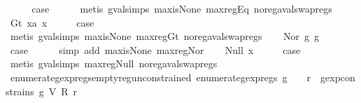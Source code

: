 \begin{isabellebody}
\ \ \isamarkupfalse%
\ \isamarkupfalse%
\ {\isacharquery}case\isanewline
\ \ \ \ \isamarkupfalse%
\ {\isacharparenleft}metis\ gval{\isachardot}simps{\isacharparenleft}{}{\isacharparenright}\ max{\isacharunderscore}is{\isacharunderscore}None\ max{\isacharunderscore}reg{\isacharunderscore}Eq\ no{\isacharunderscore}reg{\isacharunderscore}aval{\isacharunderscore}swap{\isacharunderscore}regs{\isacharparenright}\isanewline
{}\isamarkupfalse%
\isanewline
\ \ \isamarkupfalse%
\ {\isacharparenleft}Gt\ x{}a\ x{}{\isacharparenright}\isanewline
\ \ \isamarkupfalse%
\ \isamarkupfalse%
\ {\isacharquery}case\isanewline
\ \ \ \ \isamarkupfalse%
\ {\isacharparenleft}metis\ gval{\isachardot}simps{\isacharparenleft}{}{\isacharparenright}\ max{\isacharunderscore}is{\isacharunderscore}None\ max{\isacharunderscore}reg{\isacharunderscore}Gt\ no{\isacharunderscore}reg{\isacharunderscore}aval{\isacharunderscore}swap{\isacharunderscore}regs{\isacharparenright}\isanewline
{}\isamarkupfalse%
\isanewline
\ \ \isamarkupfalse%
\ {\isacharparenleft}Nor\ g{}\ g{}{\isacharparenright}\isanewline
\ \ \isamarkupfalse%
\ \isamarkupfalse%
\ {\isacharquery}case\isanewline
\ \ \ \ \isamarkupfalse%
\ {\isacharparenleft}simp\ add{\isacharcolon}\ max{\isacharunderscore}is{\isacharunderscore}None\ max{\isacharunderscore}reg{\isacharunderscore}Nor{\isacharparenright}\isanewline
{}\isamarkupfalse%
\isanewline
\ \ \isamarkupfalse%
\ {\isacharparenleft}Null\ x{\isacharparenright}\isanewline
\ \ \isamarkupfalse%
\ \isamarkupfalse%
\ {\isacharquery}case\isanewline
\ \ \ \ \isamarkupfalse%
\ {\isacharparenleft}metis\ gval{\isachardot}simps{\isacharparenleft}{}{\isacharparenright}\ max{\isacharunderscore}reg{\isacharunderscore}Null\ no{\isacharunderscore}reg{\isacharunderscore}aval{\isacharunderscore}swap{\isacharunderscore}regs{\isacharparenright}\isanewline
{}\isamarkupfalse%
%
\endisatagproof
{\isafoldproof}%
%
\isadelimproof
\isanewline
%
\endisadelimproof
\isanewline
{}\isamarkupfalse%
\ enumerate{\isacharunderscore}gexp{\isacharunderscore}regs{\isacharunderscore}empty{\isacharunderscore}reg{\isacharunderscore}unconstrained{\isacharcolon}\ {\isachardoublequoteopen}enumerate{\isacharunderscore}gexp{\isacharunderscore}regs\ g\ {\isacharequal}\ {\isacharbraceleft}{\isacharbraceright}\ {\isasymLongrightarrow}\ {\isasymforall}r{\isachardot}\ {\isasymnot}\ gexp{\isacharunderscore}constrains\ g\ {\isacharparenleft}V\ {\isacharparenleft}R\ r{\isacharparenright}{\isacharparenright}{\isachardoublequoteclose}\isanewline

\end{isabellebody}
